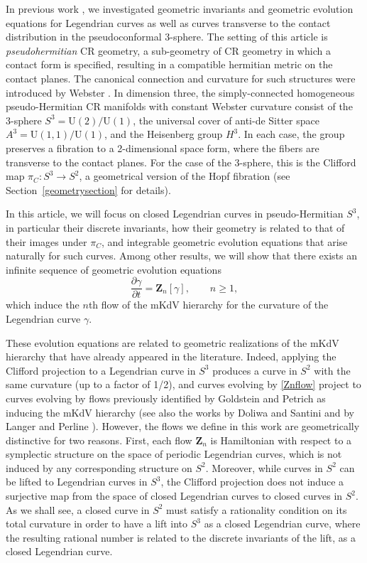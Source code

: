 \documentclass[pdftex]{sigma}
\newcommand\VZ{\mathbf Z}
\def\gam{\gamma} %
\def\di{\partial}
\newcommand\rU{\mathrm U}
\numberwithin{equation}{section}
\begin{document}
In previous work \cite{CI21,M,MNS, MS}, we investigated
geometric invariants and geometric evolution equations for Legendrian curves as well as curves transverse to the contact distribution in the pseudoconformal 3-sphere.
The setting of this article is {\em pseudohermitian} CR geometry, a sub-geometry of CR geometry in which a contact form is specified, resulting in a compatible
hermitian metric on the contact planes. The canonical connection and curvature for such structures were introduced by Webster \cite{W}. In dimension three, the simply-connected homogeneous pseudo-Hermitian CR manifolds with constant Webster curvature consist of the 3-sphere
$S^3 = \rU(2)/\rU(1)$, the universal cover of anti-de Sitter space $A^3 = \rU(1,1)/\rU(1)$, and the Heisenberg group $H^3$. In each case, the group preserves a fibration to a 2-dimensional space form, where the fibers are transverse to the contact planes.
For the case of the 3-sphere, this is the Clifford map
$\pi_C\colon   S^3 \to S^2$,
a geometrical version of the Hopf fibration (see Section~\ref{geometrysection} for details).

In this article, we will focus on closed Legendrian curves in pseudo-Hermitian $S^3$, in particular their discrete invariants, how their geometry is related
to that of their images
under $\pi_C$, and integrable geometric evolution equations that arise naturally for such curves.
Among other results, we will show that there exists an infinite sequence of geometric evolution equations
\begin{equation}\label{Znflow}
\dfrac{\di \gam}{\di t} = \VZ_n[\gam],\qquad n\ge 1,
\end{equation}
which induce the $n$th flow of the mKdV hierarchy for the curvature of the Legendrian curve $\gam$.

These evolution equations are related to geometric realizations of the mKdV hierarchy that
have already appeared in the literature.
Indeed, applying the Clifford projection to a Legendrian curve in $S^3$ produces
a curve in $S^2$ with the same curvature (up to a factor of 1/2), and curves evolving
by \eqref{Znflow} project to curves evolving by flows previously
identified by Goldstein and Petrich \cite{GP1,GP2} as inducing the mKdV hierarchy (see also the works by Doliwa and Santini \cite{DS} and by Langer and Perline \cite{LP}).
However, the flows we define in this work are geometrically distinctive for two reasons.
First, each flow $\VZ_n$ is Hamiltonian with respect to a symplectic structure on the space of periodic Legendrian curves, which is not induced by any corresponding
structure on $S^2$. Moreover, while curves in $S^2$ can be lifted to Legendrian curves in $S^3$, the Clifford projection does not induce a surjective map from
the space of closed Legendrian curves to closed curves in $S^2$. As we shall see,
a closed curve in $S^2$ must satisfy a rationality condition on its total curvature in order to have a lift into $S^3$ as a closed Legendrian curve, where the resulting rational number is related to the discrete invariants of the lift, as a closed Legendrian curve.
\end{document}

